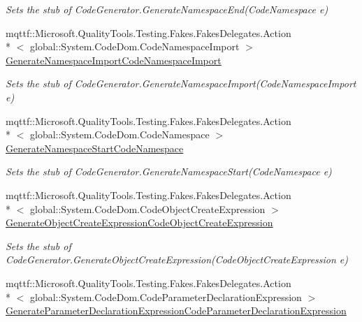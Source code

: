 \begin{DoxyCompactItemize}
\begin{DoxyCompactList}\small\item\em Sets the stub of Code\-Generator.\-Generate\-Namespace\-End(\-Code\-Namespace e)\end{DoxyCompactList}\item 
mqttf\-::\-Microsoft.\-Quality\-Tools.\-Testing.\-Fakes.\-Fakes\-Delegates.\-Action\\*
$<$ global\-::\-System.\-Code\-Dom.\-Code\-Namespace\-Import $>$ \hyperlink{class_system_1_1_code_dom_1_1_compiler_1_1_fakes_1_1_stub_code_generator_af0ba655861a833aa3d50ed197ca7b0ae}{Generate\-Namespace\-Import\-Code\-Namespace\-Import}
\begin{DoxyCompactList}\small\item\em Sets the stub of Code\-Generator.\-Generate\-Namespace\-Import(\-Code\-Namespace\-Import e)\end{DoxyCompactList}\item 
mqttf\-::\-Microsoft.\-Quality\-Tools.\-Testing.\-Fakes.\-Fakes\-Delegates.\-Action\\*
$<$ global\-::\-System.\-Code\-Dom.\-Code\-Namespace $>$ \hyperlink{class_system_1_1_code_dom_1_1_compiler_1_1_fakes_1_1_stub_code_generator_a7f6c9b29d0100652beee4776a297c112}{Generate\-Namespace\-Start\-Code\-Namespace}
\begin{DoxyCompactList}\small\item\em Sets the stub of Code\-Generator.\-Generate\-Namespace\-Start(\-Code\-Namespace e)\end{DoxyCompactList}\item 
mqttf\-::\-Microsoft.\-Quality\-Tools.\-Testing.\-Fakes.\-Fakes\-Delegates.\-Action\\*
$<$ global\-::\-System.\-Code\-Dom.\-Code\-Object\-Create\-Expression $>$ \hyperlink{class_system_1_1_code_dom_1_1_compiler_1_1_fakes_1_1_stub_code_generator_a9c810ab6697947e94f73ea8af811b7e9}{Generate\-Object\-Create\-Expression\-Code\-Object\-Create\-Expression}
\begin{DoxyCompactList}\small\item\em Sets the stub of Code\-Generator.\-Generate\-Object\-Create\-Expression(\-Code\-Object\-Create\-Expression e)\end{DoxyCompactList}\item 
mqttf\-::\-Microsoft.\-Quality\-Tools.\-Testing.\-Fakes.\-Fakes\-Delegates.\-Action\\*
$<$ global\-::\-System.\-Code\-Dom.\-Code\-Parameter\-Declaration\-Expression $>$ \hyperlink{class_system_1_1_code_dom_1_1_compiler_1_1_fakes_1_1_stub_code_generator_a229f10769cf20dbefb0f47f67d2e9436}{Generate\-Parameter\-Declaration\-Expression\-Code\-Parameter\-Declaration\-Expression}

\end{DoxyCompactItemize}
